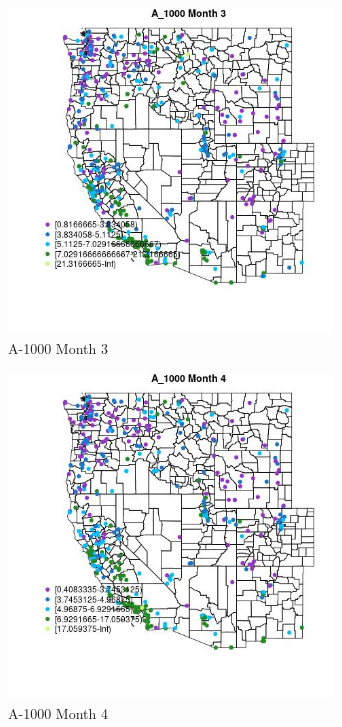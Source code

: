 \begin{figure} 
\centering  
\includegraphics[width=0.77\textwidth]{Code_Outputs/ML_input_report_ML_input_PM25_Step5_part_d_de_duplicated_aves_ML_input_MapObsMo3A_1000.jpg} 
\caption{\label{fig:ML_input_report_ML_input_PM25_Step5_part_d_de_duplicated_aves_ML_inputMapObsMo3A_1000}A-1000 Month 3} 
\end{figure} 
 

\begin{figure} 
\centering  
\includegraphics[width=0.77\textwidth]{Code_Outputs/ML_input_report_ML_input_PM25_Step5_part_d_de_duplicated_aves_ML_input_MapObsMo4A_1000.jpg} 
\caption{\label{fig:ML_input_report_ML_input_PM25_Step5_part_d_de_duplicated_aves_ML_inputMapObsMo4A_1000}A-1000 Month 4} 
\end{figure} 
 

